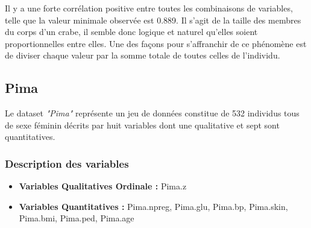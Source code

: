 \documentclass[10pt]{article}
\begin{document}
	Il y a une forte corrélation positive entre toutes les combinaisons de variables, telle que la valeur minimale observée est 0.889. 
	Il s'agit de la taille des membres du corps d'un crabe, il semble donc logique et naturel qu'elles soient proportionnelles entre elles.
	Une des façons pour s'affranchir de ce phénomène est de diviser chaque valeur par la somme totale de toutes celles de l'individu.
	
\subsection{Pima}
Le dataset \textit{"Pima"} représente un jeu de données constitue de 532 individus tous de sexe féminin décrits par huit variables dont une qualitative et sept sont quantitatives.

\subsubsection{Description des variables}

\begin{itemize}
	\item \textbf{Variables Qualitatives Ordinale :}  Pima.z
	\item \textbf{Variables Quantitatives : } Pima.npreg, Pima.glu, Pima.bp, Pima.skin, Pima.bmi, Pima.ped, Pima.age
\end{itemize}
\end{document}
